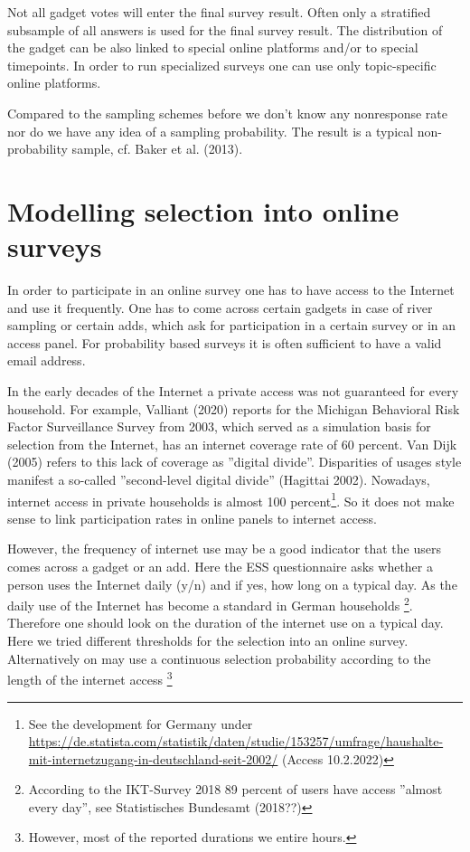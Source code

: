 \documentclass[a4paper , 11pt]{article}
\begin{document}
Not all gadget votes will enter the final survey result. Often only a stratified subsample of all answers is used for the final survey result.
The distribution of the gadget can be also linked to special online platforms and/or to special timepoints. In order to run specialized surveys one can use only topic-specific online platforms.

Compared to the sampling schemes before we don't know any nonresponse rate nor do we have any idea of a sampling probability. The result is a typical non-probability sample, cf. Baker et al. (2013).

\section{Modelling selection into online surveys}

In order to participate in an online survey one has to have access to the Internet and use it frequently. One has to come across certain gadgets in case of river sampling or certain adds, which ask for participation in a certain survey or in an access panel. For probability based surveys it is often sufficient to have a valid email address. 

In the early decades of the Internet a private access was not guaranteed for every household. For example, Valliant (2020) reports for the Michigan Behavioral Risk Factor Surveillance Survey from 2003, which served as a simulation basis for selection from the Internet, has an internet coverage rate of 60 percent. Van Dijk (2005) refers to this lack of coverage as ''digital divide''. Disparities of usages style manifest a so-called ''second-level digital divide'' (Hagittai 2002). Nowadays, internet access in private households is almost 100 percent\footnote{See the development for Germany under \url{https://de.statista.com/statistik/daten/studie/153257/umfrage/haushalte-mit-internetzugang-in-deutschland-seit-2002/} (Access 10.2.2022)}.
 So it does not make sense to link participation rates in online panels to internet access.
 
 However, the frequency of internet use may be a good indicator that the users comes across a gadget or an add. Here the ESS questionnaire asks whether  a person uses the Internet daily (y/n) and if yes, how long on a typical day. As the daily use of the Internet has become a standard in German households \footnote{According to the IKT-Survey 2018 89 percent of users have access ''almost every day'', see Statistisches Bundesamt (2018??) }. Therefore one should look on the duration of the internet  use on a typical day. Here we tried different thresholds for the selection into an online survey. Alternatively on may use a continuous selection probability according to the length of the internet access \footnote{However, most of the reported durations we entire hours.}
 
\end{document}
